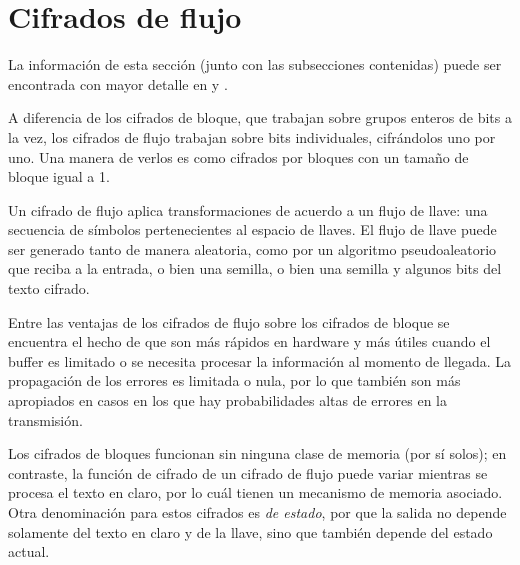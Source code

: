 %
%

\section{Cifrados de flujo}

La información de esta sección (junto con las subsecciones contenidas) puede
ser encontrada con mayor detalle en \cite{menezes, stallings} y
\cite{alan_konheim}.

A diferencia de los cifrados de bloque, que trabajan sobre grupos enteros de
bits a la vez, los cifrados de flujo trabajan sobre bits individuales,
cifrándolos uno por uno. Una manera de verlos es como cifrados por bloques con
un tamaño de bloque igual a 1.

Un cifrado de flujo aplica transformaciones de acuerdo a un flujo de llave:
una secuencia de símbolos pertenecientes al espacio de llaves. El flujo de
llave puede ser generado tanto de manera aleatoria, como por un algoritmo
pseudoaleatorio que reciba a la entrada, o bien una semilla, o bien una
semilla y algunos bits del texto cifrado.

Entre las ventajas de los cifrados de flujo sobre los cifrados de bloque se
encuentra el hecho de que son más rápidos en hardware y más útiles cuando
el buffer es limitado o se necesita procesar la información al momento de
llegada. La propagación de los errores es limitada o nula, por lo que también
son más apropiados en casos en los que hay probabilidades altas de errores en
la transmisión.

Los cifrados de bloques funcionan sin ninguna clase de memoria (por sí solos);
en contraste, la función de cifrado de un cifrado de flujo puede variar
mientras se procesa el texto en claro, por lo cuál tienen un mecanismo de
memoria asociado. Otra denominación para estos cifrados es \textit{de estado},
por que la salida no depende solamente del texto en claro y de la llave, sino
que también depende del estado actual.




